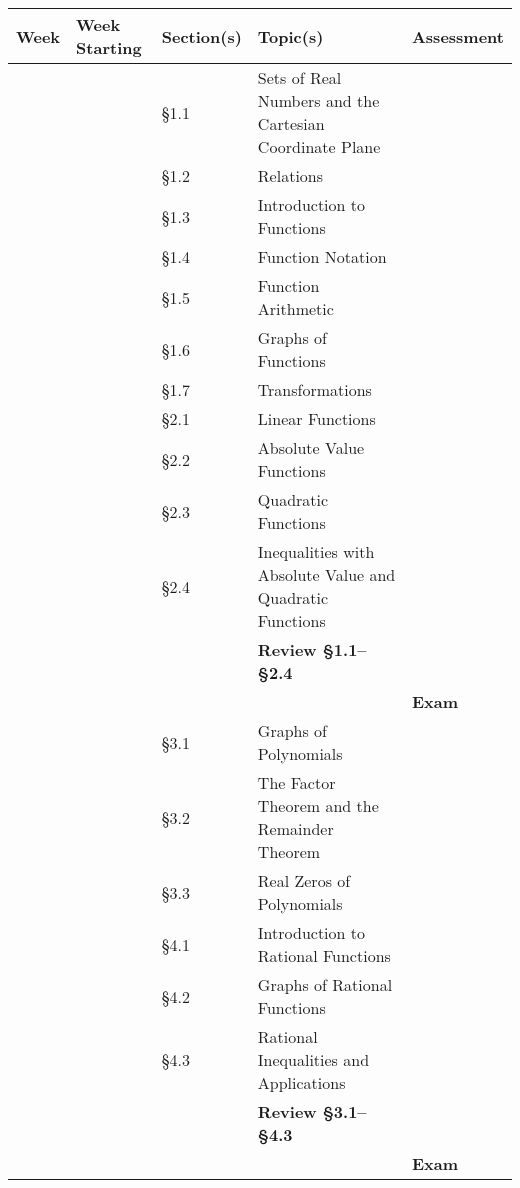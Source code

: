 \documentclass[12pt]{article}
\newcounter{on}\setcounter{on}{0}
\newcounter{ex}\setcounter{ex}{0}
\newcommand{\ex}{%
\setcounter{ex}{\value{ex}+1}
\textbf{Exam \theex}}
\newcounter{wk}\setcounter{wk}{0}
\newcommand{\wk}{%
\setcounter{wk}{\value{wk}+1}
\thewk \,\,}
\begin{document}
\begin{center}
\begin{tabular}  {|l|l|l|l|l|}
\hline
{\bf Week}  & \textbf{Week Starting} &  {\bf Section(s)} & {\bf Topic(s)} & \textbf{Assessment} \\ \hline
\wk  &  & \S 1.1 & Sets of Real Numbers and the Cartesian Coordinate Plane  &  \\ 
     &  & \S1.2  & Relations &  \\
     &  & \S1.3  & Introduction to Functions & \\ \hline
\wk  &  & \S 1.4 & Function Notation & \\ 
     &  & \S 1.5 & Function Arithmetic & \\
     &  & \S 1.6 & Graphs of Functions & \\ \hline
\wk  &  & \S 1.7  & Transformations & \\
\wk  &  & \S 2.1  & Linear Functions    & \\ 
     &  & \S 2.2  & Absolute Value Functions & \\ \hline
\wk  &  & \S 2.3  & Quadratic Functions & \\ 
     &  & \S 2.4  & Inequalities with Absolute Value and Quadratic Functions & \\ 
     &  &    & \textbf{Review  \S 1.1--\S2.4} & \\ \hline
\wk  &  &             &  & \ex \\
     &  & \S 3.1 &  Graphs of Polynomials & \\ 
     &  & \S 3.2 & The Factor Theorem and the Remainder Theorem & \\ \hline
\wk  &  & \S 3.3 & Real Zeros of Polynomials & \\ 
\wk  &  & \S 4.1 & Introduction to Rational Functions & \\ 
     &  & \S 4.2 & Graphs of Rational Functions & \\ \hline
\wk  &  & \S 4.3 & Rational Inequalities and Applications & \\
     &  &        & \textbf{Review \S 3.1--\S 4.3} & \\
     &  &        &                       & \ex \\ \hline
\end{tabular}
\end{center}
\end{document}
